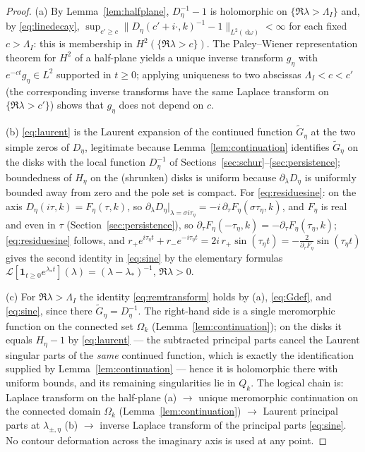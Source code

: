 \documentclass[11pt,a4paper]{amsart}
\theoremstyle{definition}
\theoremstyle{remark}
\newcommand{\dd}{\,\mathrm{d}}
\begin{document}
\begin{proof}
(a) By Lemma~\ref{lem:halfplane}, $D_\eta^{-1}-1$ is holomorphic on $\{\Re\lambda>\Lambda_I\}$ and, by \eqref{eq:linedecay}, $\sup_{c'\ge c}\|D_\eta(c'+i\cdot,k)^{-1}-1\|_{L^2(\dd\omega)}<\infty$ for each fixed $c>\Lambda_I$: this is membership in $H^2(\{\Re\lambda>c\})$. The Paley--Wiener representation theorem for $H^2$ of a half-plane \cite[Theorem~19.2]{Rudin} yields a unique inverse transform $g_\eta$ with $e^{-ct}g_\eta\in L^2$ supported in $t\ge0$; applying uniqueness to two abscissas $\Lambda_I<c<c'$ (the corresponding inverse transforms have the same Laplace transform on $\{\Re\lambda>c'\}$) shows that $g_\eta$ does not depend on $c$.

(b) \eqref{eq:laurent} is the Laurent expansion of the continued function $\widetilde G_\eta$ at the two simple zeros of $D_\eta$, legitimate because Lemma~\ref{lem:continuation} identifies $\widetilde G_\eta$ on the disks with the local function $D_\eta^{-1}$ of Sections~\ref{sec:schur}--\ref{sec:persistence}; boundedness of $H_\eta$ on the (shrunken) disks is uniform because $\partial_\lambda D_\eta$ is uniformly bounded away from zero and the pole set is compact. For \eqref{eq:residuesine}: on the axis $D_\eta(i\tau,k)=F_\eta(\tau,k)$, so $\partial_\lambda D_\eta|_{\lambda=\sigma i\tau_\eta}=-i\,\partial_\tau F_\eta(\sigma\tau_\eta,k)$, and $F_\eta$ is real and even in $\tau$ (Section~\ref{sec:persistence}), so $\partial_\tau F_\eta(-\tau_\eta,k)=-\partial_\tau F_\eta(\tau_\eta,k)$; \eqref{eq:residuesine} follows, and
$r_+e^{i\tau_\eta t}+r_-e^{-i\tau_\eta t}=2i\,r_+\sin(\tau_\eta t)=-\frac{2}{\partial_\tau F_\eta}\sin(\tau_\eta t)$
gives the second identity in \eqref{eq:sine} by the elementary formulas $\mathcal L[\mathbf 1_{t\ge0}e^{\lambda_*t}](\lambda)=(\lambda-\lambda_*)^{-1}$, $\Re\lambda>0$.

(c) For $\Re\lambda>\Lambda_I$ the identity \eqref{eq:remtransform} holds by (a), \eqref{eq:Gdef}, and \eqref{eq:sine}, since there $\widetilde G_\eta=D_\eta^{-1}$. The right-hand side is a single meromorphic function on the connected set $\Omega_k$ (Lemma~\ref{lem:continuation}); on the disks it equals $H_\eta-1$ by \eqref{eq:laurent} --- the subtracted principal parts cancel the Laurent singular parts of the \emph{same} continued function, which is exactly the identification supplied by Lemma~\ref{lem:continuation} --- hence it is holomorphic there with uniform bounds, and its remaining singularities lie in $Q_k$. The logical chain is: Laplace transform on the half-plane (a) $\to$ unique meromorphic continuation on the connected domain $\Omega_k$ (Lemma~\ref{lem:continuation}) $\to$ Laurent principal parts at $\lambda_{\pm,\eta}$ (b) $\to$ inverse Laplace transform of the principal parts \eqref{eq:sine}. No contour deformation across the imaginary axis is used at any point.
\end{proof}
\end{document}
